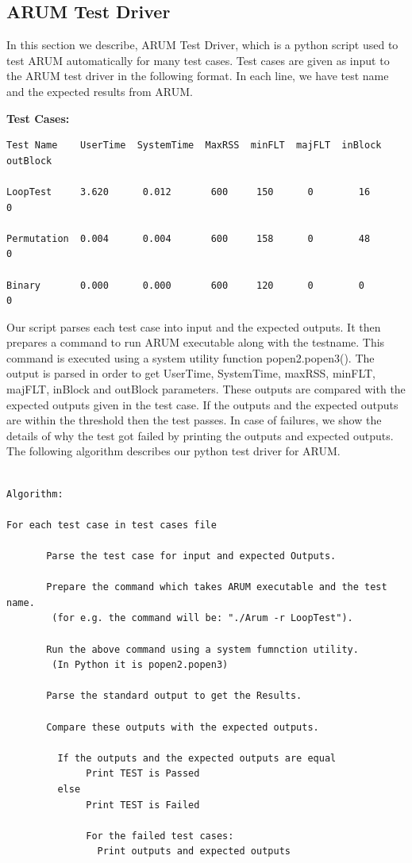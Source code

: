 \documentclass[11pt,letterpaper,oneside]{article}
\begin{document}
\subsection{ARUM Test Driver}

In this section we describe, ARUM Test Driver, which is a python script used to test ARUM automatically for many test cases. Test cases are given as input to the ARUM test driver in the following format. In each line, we have test name and the expected results from ARUM.\newline

{\bf Test Cases:}

\begin{verbatim}
Test Name    UserTime  SystemTime  MaxRSS  minFLT  majFLT  inBlock  outBlock

LoopTest     3.620      0.012       600     150      0        16       0

Permutation  0.004      0.004       600     158      0        48       0

Binary       0.000      0.000       600     120      0        0        0

\end{verbatim}

Our script parses each test case into input and the expected outputs. It then prepares a command to run ARUM executable along with the testname. This command is executed using a system utility function popen2.popen3(). The output is parsed in order to get UserTime, SystemTime, maxRSS, minFLT, majFLT, inBlock and outBlock parameters. These outputs are compared with the expected outputs given in the test case. If the outputs and the expected outputs are within the threshold then the test passes. In case of failures, we show the details of why the test got failed by printing the outputs and expected outputs. The following algorithm describes our python test driver for ARUM.\newline

\begin{verbatim}

Algorithm:

For each test case in test cases file

       Parse the test case for input and expected Outputs.
     
       Prepare the command which takes ARUM executable and the test name.
        (for e.g. the command will be: "./Arum -r LoopTest").
       
       Run the above command using a system fumnction utility.
        (In Python it is popen2.popen3)

       Parse the standard output to get the Results.

       Compare these outputs with the expected outputs.
       
         If the outputs and the expected outputs are equal
              Print TEST is Passed
         else 
              Print TEST is Failed

              For the failed test cases:
                Print outputs and expected outputs
\end{verbatim}
\end{document}
